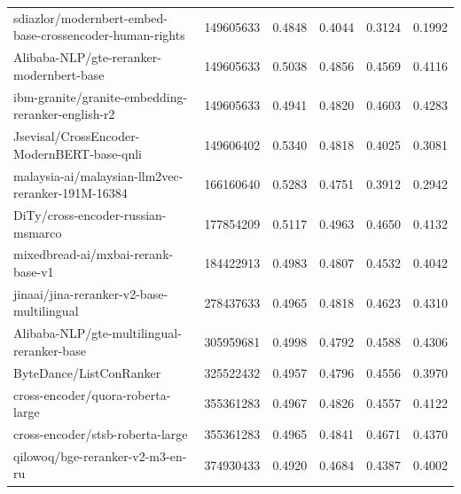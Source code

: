 {\begin{xltabular}{\textwidth}{X rrrrr}
      sdiazlor/modernbert-embed-base-crossencoder-human-rights               & 149605633     & 0.4848        & 0.4044        & 0.3124        & 0.1992         \\
      Alibaba-NLP/gte-reranker-modernbert-base                               & 149605633     & 0.5038        & 0.4856        & 0.4569        & 0.4116         \\
      ibm-granite/granite-embedding-reranker-english-r2                      & 149605633     & 0.4941        & 0.4820        & 0.4603        & 0.4283         \\
      Jsevisal/CrossEncoder-ModernBERT-base-qnli                             & 149606402     & 0.5340        & 0.4818        & 0.4025        & 0.3081         \\
      malaysia-ai/malaysian-llm2vec-reranker-191M-16384                      & 166160640     & 0.5283        & 0.4751        & 0.3912        & 0.2942         \\
      DiTy/cross-encoder-russian-msmarco                                     & 177854209     & 0.5117        & 0.4963        & 0.4650        & 0.4132         \\
      mixedbread-ai/mxbai-rerank-base-v1                                     & 184422913     & 0.4983        & 0.4807        & 0.4532        & 0.4042         \\
      jinaai/jina-reranker-v2-base-multilingual                              & 278437633     & 0.4965        & 0.4818        & 0.4623        & 0.4310         \\
      Alibaba-NLP/gte-multilingual-reranker-base                             & 305959681     & 0.4998        & 0.4792        & 0.4588        & 0.4306         \\
      ByteDance/ListConRanker                                                & 325522432     & 0.4957        & 0.4796        & 0.4556        & 0.3970         \\
      cross-encoder/quora-roberta-large                                      & 355361283     & 0.4967        & 0.4826        & 0.4557        & 0.4122         \\
      cross-encoder/stsb-roberta-large                                       & 355361283     & 0.4965        & 0.4841        & 0.4671        & 0.4370         \\
      qilowoq/bge-reranker-v2-m3-en-ru                                       & 374930433     & 0.4920        & 0.4684        & 0.4387        & 0.4002         \\

\end{xltabular}}
